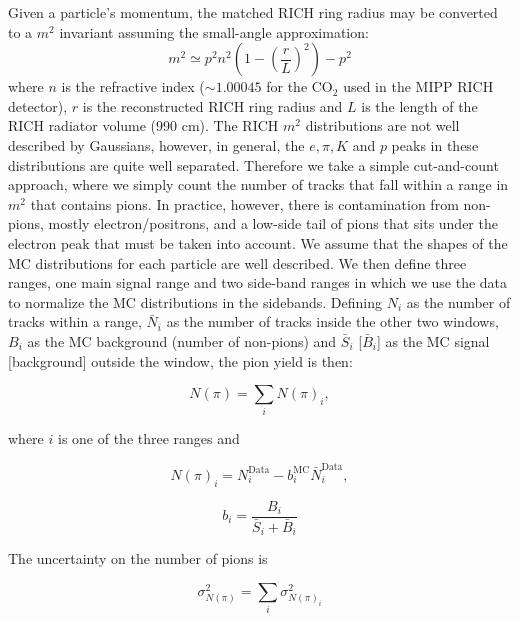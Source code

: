 \documentclass[%
aps, prd, reprint, show pacs, preprint numbers, ams math, amssymb, superscriptaddress, linenumbers]{revtex4-1}
\begin{document}
Given a particle's momentum, the matched RICH ring radius may be converted to a $m^2$ invariant assuming the small-angle approximation:
\begin{equation}
m^2 \simeq p^2 n^2\left(1 - \left(\frac{r}{L}\right)^2\right) - p^2
\end{equation}
where $n$ is the refractive index ($\sim1.00045$ for the CO$_2$ used in the MIPP RICH detector), $r$ is the reconstructed RICH ring radius and $L$ is the length of the RICH radiator volume (990 cm).
The RICH $m^2$ distributions are not well described by Gaussians, however, in general, the $e, \pi, K$ and $p$ peaks in these distributions are quite well separated.  Therefore we take a simple cut-and-count approach, where we simply count the number of tracks that fall within a range in $m^2$ that contains pions.  In practice, however, there is contamination from non-pions, mostly electron/positrons, and a low-side tail of pions that sits under the electron peak that must be taken into account.  We assume that the shapes of the MC distributions for each particle are well described.  We then define three ranges, one main signal range and two side-band ranges in which we use the data to normalize the MC distributions in the sidebands.  Defining $N_i$ as the number of tracks within a range, $\bar{N}_i$ as the number of tracks inside the other two windows, $B_i$ as the MC background (number of non-pions) and $\bar{S}_i$ [$\bar{B}_i$] as the MC signal [background] outside the window, the pion yield is then:

\begin{equation}
N(\pi) = \sum_i N(\pi)_i,
\end{equation}

where $i$ is one of the three ranges and

\begin{equation}
N(\pi)_i = N_i^\mathrm{Data} - b_i^\mathrm{MC}\bar{N}_i^\mathrm{Data},
\end{equation}

\begin{equation}
b_i = \frac{B_i}{\bar{S}_i + \bar{B}_i}
\end{equation}

The uncertainty on the number of pions is

\begin{equation}
\sigma^2_{N(\pi)} = \sum_i \sigma^2_{N(\pi)_i}
\end{equation}
\end{document}
